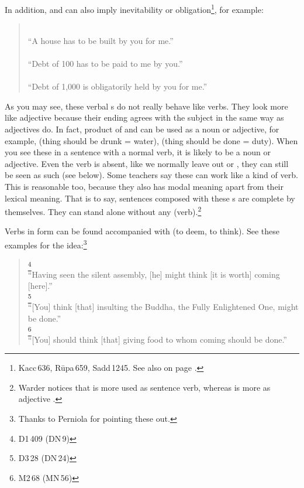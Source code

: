 In addition,  and  can also imply inevitability or obligation\footnote{Kacc\,636, R\=upa\,659, Sadd\,1245. See also  on page \pageref{pacck1:dnii}.}, for example:
\begin{quote}
\\
``A house has to be built by you for me.''\\[1.5mm]
\\
``Debt of 100 has to be paid to me by you.''\\[1.5mm]
\\
``Debt of 1,000 is obligatorily held by you for me.''\\[1.5mm]
\end{quote}

As you may see, these verbal s do not really behave like verbs. They look more like adjective because their ending agrees with the subject in the same way as adjectives do. In fact, product of  and  can be used as a noun or adjective, for example,  (thing should be drunk = water),  (thing should be done = duty). When you see these in a sentence with a normal verb, it is likely to be a noun or adjective. Even the verb is absent, like we normally leave out  or , they can still be seen as such (see below). Some teachers say these can work like a kind of verb. This is reasonable too, because they also has modal meaning apart from their lexical meaning. That is to say, sentences composed with these s are complete by themselves. They can stand alone without any  (verb).\footnote{Warder notices that  is more used as sentence verb, whereas  is more as adjective \citep[p.~104]{warder:intro}.}

Verbs in  form can be found accompanied with  (to deem, to think). See these examples for the idea:\footnote{Thanks to Perniola \citep[p.~371]{perniola:grammar} for pointing these out.}

\begin{quote}
\footnote{D1\,409 (DN\,9)}\\
``Having seen the silent assembly, [he] might think [it is worth] coming [here].''\\[1.5mm]
\footnote{D3\,28 (DN\,24)}\\
``[You] think [that] insulting the Buddha, the Fully Enlightened One, might be done.''\\[1.5mm]
\footnote{M2\,68 (MN\,56)}\\
``[You] should think [that] giving food to whom coming should be done.''\\[1.5mm]
\end{quote}

